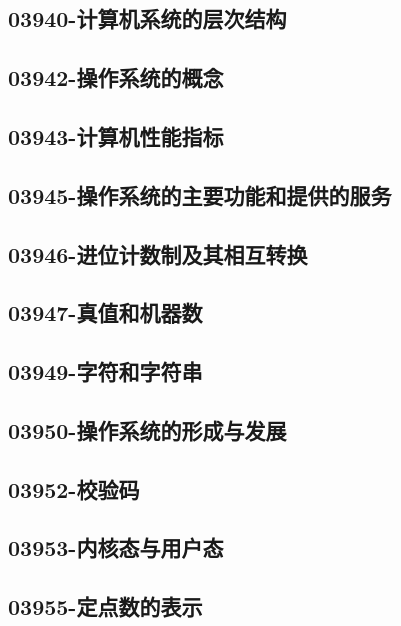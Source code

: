 \subsection{03940-计算机系统的层次结构}

\subsection{03942-操作系统的概念}

\subsection{03943-计算机性能指标}

\subsection{03945-操作系统的主要功能和提供的服务}

\subsection{03946-进位计数制及其相互转换}

\subsection{03947-真值和机器数}

\subsection{03949-字符和字符串}

\subsection{03950-操作系统的形成与发展}

\subsection{03952-校验码}

\subsection{03953-内核态与用户态}

\subsection{03955-定点数的表示}

